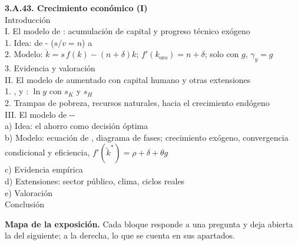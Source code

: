 \documentclass[11pt]{article}
\begin{document}
\begin{esquema}
\textbf{3.A.43. Crecimiento económico (I)}\\[2pt]
Introducción\\
I. El modelo de : acumulación de capital y progreso técnico exógeno\\
\hspace*{1.5em}1. Idea: de - ($s/v=n$) a \\
\hspace*{1.5em}2. Modelo: $\dot k=s\,f(k)-(n+\delta)k$; $f'(k_{\mathrm{oro}})=n+\delta$; solo con $g$, $\gamma_y=g$\\
\hspace*{1.5em}3. Evidencia y valoración\\
II. El modelo de  aumentado con capital humano y otras extensiones\\
\hspace*{1.5em}1. ,  y : $\ln y$ con $s_K$ y $s_H$\\
\hspace*{1.5em}2. Trampas de pobreza, recursos naturales, hacia el crecimiento endógeno\\
III. El modelo de --\\
\hspace*{1.5em}a) Idea: el ahorro como decisión óptima\\
\hspace*{1.5em}b) Modelo: ecuación de , diagrama de fases; crecimiento exógeno, convergencia condicional y eficiencia, $f'(\tilde k^*)=\rho+\delta+\theta g$\\
\hspace*{1.5em}c) Evidencia empírica\\
\hspace*{1.5em}d) Extensiones: sector público, clima, ciclos reales\\
\hspace*{1.5em}e) Valoración\\
Conclusión
\end{esquema}

\begin{anotaciones}
\textbf{Mapa de la exposición.} Cada bloque responde a una pregunta y deja abierta la del siguiente; a la derecha, lo que se cuenta en sus apartados.
\begin{infografiacaja}
\caption{Mapa de la exposición: la pregunta de cada bloque y el hilo que los une}\label{figu:mapa-tema}
\end{infografiacaja}
\end{anotaciones}
\end{document}
